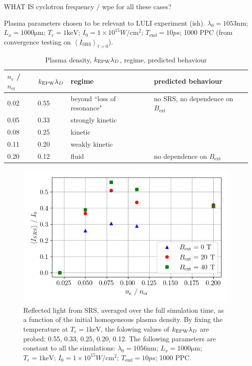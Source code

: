WHAT IS cyclotron frequency / wpe for all these cases?

Plasma parameters chosen to be relevant to LULI experiment (ish). $\lambda_0 = 1053 \si{\nano\metre}$; $L_x = 1000 \si{\micro\metre}$; $T_e = 1 \si{\kilo\electronvolt}$; $I_0 = 1\times 10^{15}\si{W/\cm^2}$; $T_{\mathrm{end}}=10 \si{ps}$; 1000 PPC (from convergence testing on $\left< I_{\mathrm{SRS}} \right>_{t>0}$).

\begin{table}[h]
\begin{center}

\begin{tabular}{|l|l|l|l|}
\hline
$n_e$ / $n_{\mathrm{cr}}$ & $k_\mathrm{EPW}\lambda_D$ & regime & predicted behaviour\\ \hline \hline
0.02 & 0.55 & beyond ``loss of resonance" & no SRS, no dependence on $B_{\mathrm{ext}}$  \\ \hline
0.05 & 0.33 & strongly kinetic &  \\ \hline
0.08 & 0.25 & kinetic &  \\ \hline
0.11 & 0.20 & weakly kinetic & \\ \hline
0.20 & 0.12 & fluid & no dependence on $B_{\mathrm{ext}}$\\ \hline

\end{tabular}

\end{center}
\caption{Plasma density, $k_\mathrm{EPW}\lambda_D$, regime, predicted behaviour}
\label{tab:predictions}
\end{table}

\begin{figure}[ht]
   \centering
    \includegraphics[width=0.9\columnwidth]{Chapters/C6_magSRS/kld_scan_SRS_scaling.png}
    \caption{Reflected light from SRS, averaged over the full simulation time, as a function of the initial homogeneous plasma density. By fixing the temperature at $T_e = 1\si{\kilo\electronvolt}$, the folowing values of $k_\mathrm{EPW}\lambda_D$ are probed: 0.55, 0.33, 0.25, 0.20, 0.12. The following parameters are constant to all the simulations: 
 $\lambda_0 = 1056 \si{\nano\metre}$; $L_x = 1000 \si{\micro\metre}$; $T_e = 1 \si{\kilo\electronvolt}$; $I_0 = 1\times 10^{15}\si{W/\cm^2}$; $T_{\mathrm{end}}=10 \si{ps}$; 1000 PPC.}
    \label{fig:SRS_EPOCH}
\end{figure}{}


